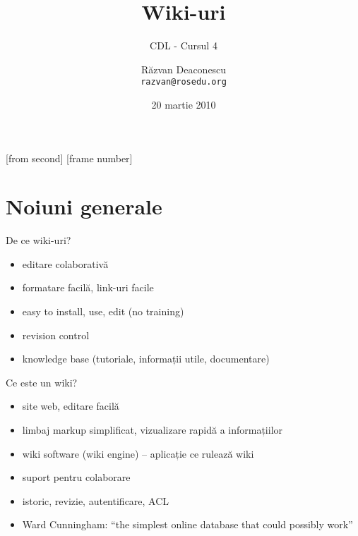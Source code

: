 \documentclass{beamer}
\title[Wiki-uri]{Wiki-uri}
\subtitle{CDL - Cursul 4}
\institute[ROSEdu]{ROSEdu}
\date{20 martie 2010}
\author{Răzvan Deaconescu \\ \texttt{razvan@rosedu.org}}
\begin{document}
[from second]
[frame number]

\frame{\titlepage}

\frame{\tableofcontents}


\section{Noiuni generale}

\frame{\tableofcontents[currentsection]}


\begin{frame}{De ce wiki-uri?}
  \begin{itemize}
    \item editare colaborativă
    \item formatare facilă, link-uri facile
    \item easy to install, use, edit (no training)
    \item revision control
    \item knowledge base (tutoriale, informații utile, documentare)
  \end{itemize}
\end{frame}

\begin{frame}{Ce este un wiki?}
  \begin{itemize}
    \item site web, editare facilă
    \item limbaj markup simplificat, vizualizare rapidă a informațiilor
    \item wiki software (wiki engine) -- aplicație ce rulează wiki
    \item suport pentru colaborare
    \item istoric, revizie, autentificare, ACL
    \item Ward Cunningham: ``the simplest online database that could possibly
work''
  \end{itemize}
\end{frame}
\end{document}

